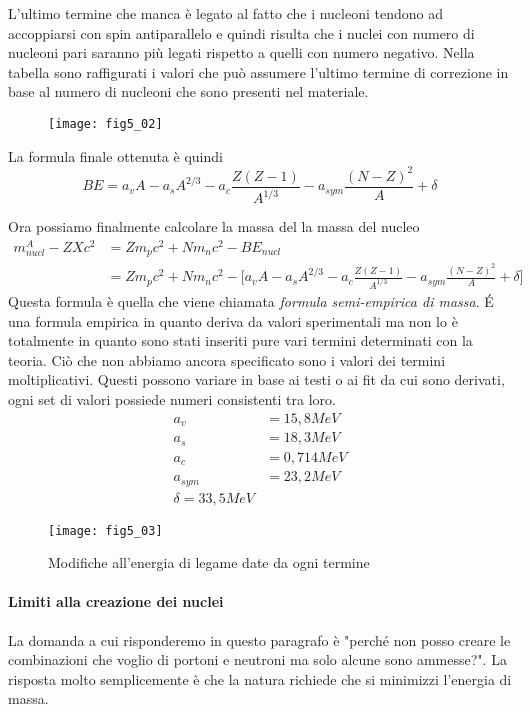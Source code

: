 L'ultimo termine che manca è legato al fatto che i nucleoni tendono ad accoppiarsi con spin antiparallelo e quindi risulta che i nuclei con numero di nucleoni pari saranno più legati rispetto a quelli con numero negativo.
Nella tabella sono raffigurati i valori che può assumere l'ultimo termine di correzione in base al numero di nucleoni che sono presenti nel materiale.
\begin{figure}[h]
\centering
\texttt{[image: fig5\_02]}
\end{figure}

La formula finale ottenuta è quindi
\begin{equation}
BE=a_vA-a_sA^{2/3}-a_c\frac{Z(Z-1)}{A^{1/3}}-a_{sym}\frac{(N-Z)^2}{A}+\delta
\end{equation}

Ora possiamo finalmente calcolare la massa del la massa del nucleo
\begin{equation}
\begin{split}
m_{nucl} ^A-Z X c^2 &=Z m_p c^2+N m_n c^2- BE_{nucl} \\
&=Zm_pc^2+Nm_nc^2-\biggl[ a_v A-a_s A^{2/3}-a_c \frac{Z(Z-1)}{A^{1/3}}-a_{sym}\frac{(N-Z)^2}{A}+\delta \biggl]
\end{split}
\label{formula_semiempirica_massa}
\end{equation}
Questa formula è quella che viene chiamata \emph{formula semi-empirica di massa}.
\'E una formula empirica in quanto deriva da valori sperimentali ma non lo è totalmente in quanto sono stati inseriti pure vari termini determinati con la teoria.
Ciò che non abbiamo ancora specificato sono i valori dei termini moltiplicativi. 
Questi possono variare in base ai testi o ai fit da cui sono derivati, ogni set di valori possiede numeri consistenti tra loro.
\begin{equation}
\begin{split}
a_v &=15,8MeV\\
a_s&=18,3MeV\\
a_c&=0,714MeV\\
a_{sym}&=23,2MeV\\
\delta=33,5MeV
\end{split}
\end{equation}
\begin{figure}[h]
\centering
\texttt{[image: fig5\_03]}
\caption{Modifiche all'energia di legame date da ogni termine}
\end{figure}

\paragraph{Limiti alla creazione dei nuclei}
La domanda a cui risponderemo in questo paragrafo è "perché non posso creare le combinazioni che voglio di portoni e neutroni ma solo alcune sono ammesse?".
La risposta molto semplicemente è che la natura richiede che si minimizzi l'energia di massa.

